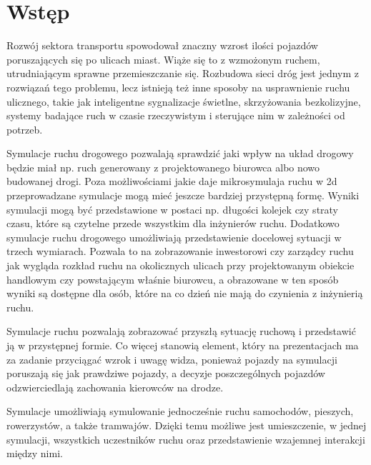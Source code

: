 \documentclass{sprawozdanie-agh}
\begin{document}

	\stronatytulowa{}

		\section{Wstęp}

		Rozwój sektora transportu spowodował znaczny wzrost ilości pojazdów poruszających się po ulicach miast. Wiąże się to z wzmożonym ruchem, utrudniającym sprawne przemieszczanie się. Rozbudowa sieci dróg jest jednym z rozwiązań tego problemu, lecz istnieją też inne sposoby na usprawnienie ruchu ulicznego, takie jak inteligentne sygnalizacje świetlne, skrzyżowania bezkolizyjne, systemy badające ruch w czasie rzeczywistym i sterujące nim w zależności od potrzeb.

		Symulacje ruchu drogowego pozwalają sprawdzić jaki wpływ na układ drogowy będzie miał np. ruch generowany z projektowanego biurowca albo nowo budowanej drogi. Poza możliwościami jakie daje mikrosymulaja ruchu w 2d przeprowadzane symulacje mogą mieć  jeszcze bardziej przystępną formę. Wyniki symulacji mogą być przedstawione w postaci np. długości kolejek czy straty czasu, które są czytelne przede wszystkim dla inżynierów ruchu. Dodatkowo symulacje ruchu drogowego umożliwiają przedstawienie docelowej sytuacji w trzech wymiarach. Pozwala to na zobrazowanie inwestorowi czy zarządcy ruchu jak wygląda rozkład ruchu na okolicznych ulicach przy projektowanym obiekcie handlowym czy powstającym właśnie biurowcu, a obrazowane w ten sposób wyniki są dostępne dla osób, które na co dzień nie mają do czynienia z inżynierią ruchu.

		Symulacje ruchu pozwalają zobrazować przyszłą sytuację ruchową i przedstawić ją w przystępnej formie. Co więcej stanowią element, który na prezentacjach ma za zadanie przyciągać wzrok i uwagę widza, ponieważ pojazdy na symulacji poruszają się jak prawdziwe pojazdy, a decyzje poszczególnych pojazdów odzwierciedlają zachowania kierowców na drodze.

		Symulacje umożliwiają symulowanie jednocześnie ruchu samochodów, pieszych, rowerzystów, a także tramwajów. Dzięki temu możliwe jest umieszczenie, w jednej symulacji, wszystkich uczestników ruchu oraz przedstawienie wzajemnej interakcji między nimi.
\end{document}

